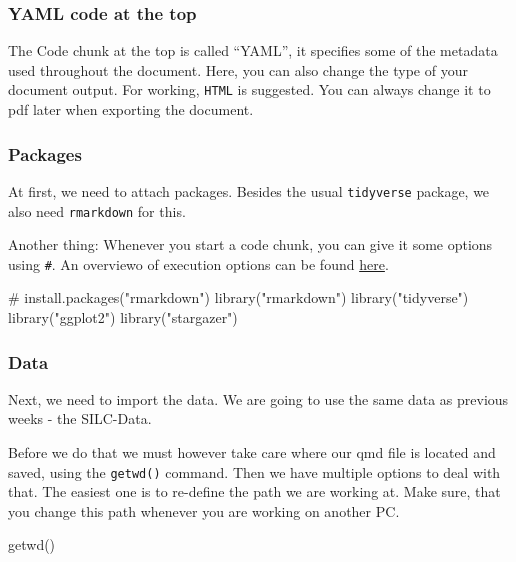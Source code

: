 \documentclass[
  letterpaper,
  DIV=11,
  numbers=noendperiod]{scrartcl}
\newenvironment{Shaded}{\begin{snugshade}}{\end{snugshade}}
\newcommand{\CommentTok}[1]{\textcolor[rgb]{0.37,0.37,0.37}{#1}}
\newcommand{\FunctionTok}[1]{\textcolor[rgb]{0.28,0.35,0.67}{#1}}
\newcommand{\NormalTok}[1]{\textcolor[rgb]{0.00,0.23,0.31}{#1}}
\newcommand{\StringTok}[1]{\textcolor[rgb]{0.13,0.47,0.30}{#1}}
\begin{document}
\subsubsection{YAML code at the top}\label{yaml-code-at-the-top}

The Code chunk at the top is called ``YAML'', it specifies some of the
metadata used throughout the document. Here, you can also change the
type of your document output. For working, \texttt{HTML} is suggested.
You can always change it to pdf later when exporting the document.

\subsubsection{Packages}\label{packages}

At first, we need to attach packages. Besides the usual
\texttt{tidyverse} package, we also need \texttt{rmarkdown} for this.

Another thing: Whenever you start a code chunk, you can give it some
options using \texttt{\#\textbar{}}. An overviewo of execution options
can be found
\href{https://quarto.org/docs/computations/execution-options.html}{here}.

\begin{Shaded}
\begin{Highlighting}[]
\CommentTok{\# install.packages("rmarkdown")}
\FunctionTok{library}\NormalTok{(}\StringTok{"rmarkdown"}\NormalTok{)}
\FunctionTok{library}\NormalTok{(}\StringTok{"tidyverse"}\NormalTok{)}
\FunctionTok{library}\NormalTok{(}\StringTok{"ggplot2"}\NormalTok{)}
\FunctionTok{library}\NormalTok{(}\StringTok{"stargazer"}\NormalTok{)}
\end{Highlighting}
\end{Shaded}

\subsubsection{Data}\label{data}

Next, we need to import the data. We are going to use the same data as
previous weeks - the SILC-Data.

Before we do that we must however take care where our qmd file is
located and saved, using the \texttt{getwd()} command. Then we have
multiple options to deal with that. The easiest one is to re-define the
path we are working at. Make sure, that you change this path whenever
you are working on another PC.

\begin{Shaded}
\begin{Highlighting}[]
\FunctionTok{getwd}\NormalTok{()}
\end{Highlighting}
\end{Shaded}
\end{document}
